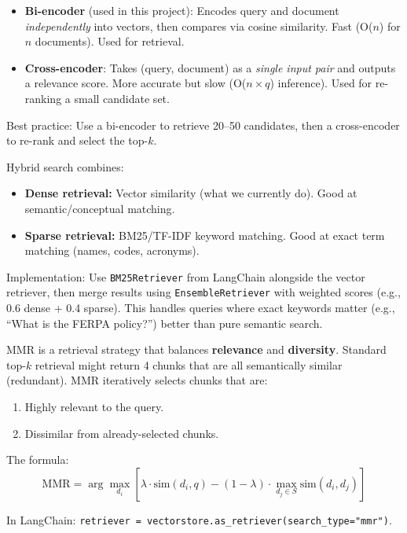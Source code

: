 \documentclass[12pt,a4paper]{article}
\begin{document}
\begin{interviewbox}
\end{interviewbox}
\begin{answerbox}
\begin{itemize}
  \item \textbf{Bi-encoder} (used in this project): Encodes query and document \textit{independently} into vectors, then compares via cosine similarity. Fast (O($n$) for $n$ documents). Used for retrieval.
  \item \textbf{Cross-encoder}: Takes (query, document) as a \textit{single input pair} and outputs a relevance score. More accurate but slow (O($n \times q$) inference). Used for re-ranking a small candidate set.
\end{itemize}
Best practice: Use a bi-encoder to retrieve 20--50 candidates, then a cross-encoder to re-rank and select the top-$k$.
\end{answerbox}

\begin{interviewbox}
\end{interviewbox}
\begin{answerbox}
Hybrid search combines:
\begin{itemize}
  \item \textbf{Dense retrieval:} Vector similarity (what we currently do). Good at semantic/conceptual matching.
  \item \textbf{Sparse retrieval:} BM25/TF-IDF keyword matching. Good at exact term matching (names, codes, acronyms).
\end{itemize}
Implementation: Use \texttt{BM25Retriever} from LangChain alongside the vector retriever, then merge results using \texttt{EnsembleRetriever} with weighted scores (e.g., 0.6 dense + 0.4 sparse). This handles queries where exact keywords matter (e.g., ``What is the FERPA policy?'') better than pure semantic search.
\end{answerbox}

\begin{interviewbox}
\end{interviewbox}
\begin{answerbox}
MMR is a retrieval strategy that balances \textbf{relevance} and \textbf{diversity}. Standard top-$k$ retrieval might return 4 chunks that are all semantically similar (redundant). MMR iteratively selects chunks that are:
\begin{enumerate}
  \item Highly relevant to the query.
  \item Dissimilar from already-selected chunks.
\end{enumerate}
The formula:
$$\text{MMR} = \arg\max_{d_i} \left[ \lambda \cdot \text{sim}(d_i, q) - (1-\lambda) \cdot \max_{d_j \in S} \text{sim}(d_i, d_j) \right]$$

In LangChain: \texttt{retriever = vectorstore.as\_retriever(search\_type="mmr")}.
\end{answerbox}
\end{document}
